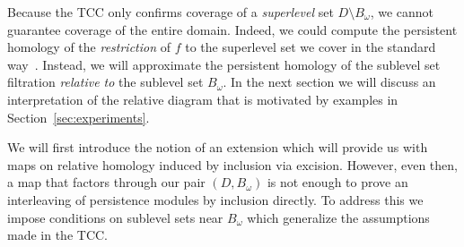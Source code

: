 

%

Because the TCC only confirms coverage of a \emph{superlevel} set $D\setminus B_\omega$, we cannot guarantee coverage of the entire domain.
Indeed, we could compute the persistent homology of the \emph{restriction} of $f$ to the superlevel set we cover in the standard way~\cite{chazal09analysis}.
Instead, we will approximate the persistent homology of the sublevel set filtration \emph{relative to} the sublevel set $B_\omega$.
In the next section we will discuss an interpretation of the relative diagram that is motivated by examples in Section~\ref{sec:experiments}.

We will first introduce the notion of an extension which will provide us with maps on relative homology induced by inclusion via excision.
However, even then, a map that factors through our pair $(D, B_\omega)$ is not enough to prove an interleaving of persistence modules by inclusion directly.
To address this we impose conditions on sublevel sets near $B_\omega$ which generalize the assumptions made in the TCC.

